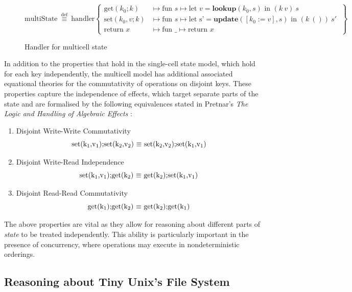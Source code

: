 \documentclass[logo,bsc,singlespacing,parskip]{infthesis}
\begin{document}
\begin{figure}[H]
\centering
\[
\text{multiState}\ \overset{\text{def}}{\equiv} \ \text{handler} \left\{
\begin{array}{ll}
\text{get}(k_0; k) &\mapsto \text{fun } s \mapsto \text{let } v = \textbf{lookup}(k_0, s) \text{ in } (k\ v)\ s \\
\text{set}(k_0, v; k) &\mapsto \text{fun } s \mapsto \text{let s'} = \textbf{update}([k_0:=v],s) \text{ in } (k\ ())\ s'\ \\
\text{return } x &\mapsto \text{fun } \_ \mapsto \text{return } x
\end{array}
\right\}
\]
\caption{Handler for multicell state}
\label{fig:multicell-handler}
\end{figure}

In addition to the properties that hold in the single-cell state model, which hold for each key independently,  the multicell model has additional associated equational theories for the commutativity of operations on disjoint keys. These properties capture the independence of effects, which target separate parts of the state and are formalised by the following equivalences stated in Pretnar's \textit{The Logic and Handling of
Algebraic Effects} \cite{Pretnar:2010}:
\begin{enumerate}
    \item Disjoint Write-Write Commutativity \[ \text{set(k\textsubscript{1},v\textsubscript{1});set(k\textsubscript{2},v\textsubscript{2}) $\equiv$ set(k\textsubscript{2},v\textsubscript{2});set(k\textsubscript{1},v\textsubscript{1})} \] 
    \item Disjoint Write-Read Independence \[ \text{set(k\textsubscript{1},v\textsubscript{1});get(k\textsubscript{2}) $\equiv$ get(k\textsubscript{2});set(k\textsubscript{1},v\textsubscript{1})} \] 
    \item Disjoint Read-Read Commutativity \[\text{get(k\textsubscript{1});get(k\textsubscript{2}) $\equiv$ get(k\textsubscript{2});get(k\textsubscript{1})} \] 
\end{enumerate}

The above properties are vital as they allow for reasoning about different parts of \textit{state} to be treated independently. This ability is particularly important in the presence of concurrency, where operations may execute in nondeterministic orderings.


\subsection{Reasoning about Tiny Unix's File System}
\end{document}
